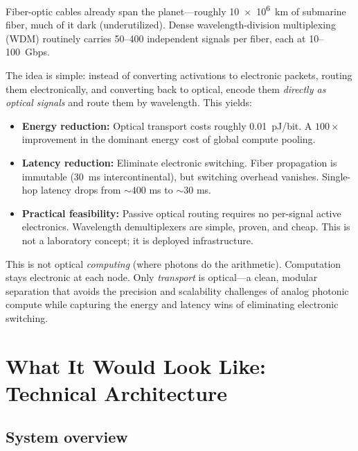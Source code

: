 \documentclass[12pt]{article}
\begin{document}
Fiber-optic cables already span the planet---roughly \SI{10e6}{km} of submarine
fiber, much of it dark (underutilized). Dense wavelength-division multiplexing
(WDM) routinely carries 50--400 independent signals per fiber, each at 10--100~Gbps.

The idea is simple: instead of converting activations to electronic packets,
routing them electronically, and converting back to optical, encode them
\emph{directly as optical signals} and route them by wavelength. This yields:

\begin{itemize}[leftmargin=1.6em,itemsep=4pt]
  \item \textbf{Energy reduction:} Optical transport costs roughly \SI{0.01}{pJ/bit}.
  A \(100\times\) improvement in the dominant energy cost of global compute pooling.
  \item \textbf{Latency reduction:} Eliminate electronic switching. Fiber
  propagation is immutable (\SI{30}{ms} intercontinental), but switching overhead
  vanishes. Single-hop latency drops from \(\sim400\) ms to \(\sim30\) ms.
  \item \textbf{Practical feasibility:} Passive optical routing requires no
  per-signal active electronics. Wavelength demultiplexers are simple, proven,
  and cheap. This is not a laboratory concept; it is deployed infrastructure.
\end{itemize}

This is not optical \emph{computing} (where photons do the arithmetic).
Computation stays electronic at each node. Only \emph{transport} is optical---a
clean, modular separation that avoids the precision and scalability challenges
of analog photonic compute while capturing the energy and latency wins of
eliminating electronic switching.

\section{What It Would Look Like: Technical Architecture}
\label{sec:tech}

\subsection{System overview}
\end{document}
